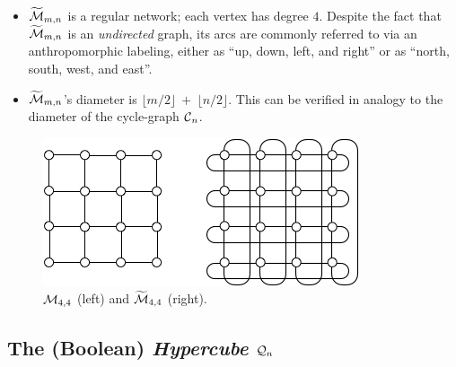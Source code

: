 \begin{itemize}
\begin{itemize}
  \item
$\widetilde{\mbox{$\cal M$}}_{m,n}$ is a regular network; each vertex has degree $4$.
    Despite the fact that $\widetilde{\mbox{$\cal M$}}_{m,n}$ is an {\em
      undirected} graph, its arcs are commonly referred to via an
    anthropomorphic labeling, either as ``up, down, left, and right''
    or as ``north, south, west, and east''.
  \item {}
$\widetilde{\mbox{$\cal M$}}_{m,n}$'s diameter is $\lfloor m/2 \rfloor \ + \
\lfloor n/2 \rfloor$.  This can be verified in analogy to the diameter
of the cycle-graph $\mbox{$\cal C$}_n$.
\end{itemize}
\end{itemize}

\begin{figure}[hbt]
\begin{center}
       \includegraphics[scale=0.6]{FiguresGraph/meshtorus}
       \caption{$\mbox{$\cal M$}_{4,4}$ (left) and $\widetilde{\mbox{$\cal M$}}_{4,4}$ (right).}
  \label{fig:torus}
\end{center}
\end{figure}

\subsection{The (Boolean) {\it Hypercube} $\mbox{$\cal Q$}_n$}
\label{sec:hypercube}

